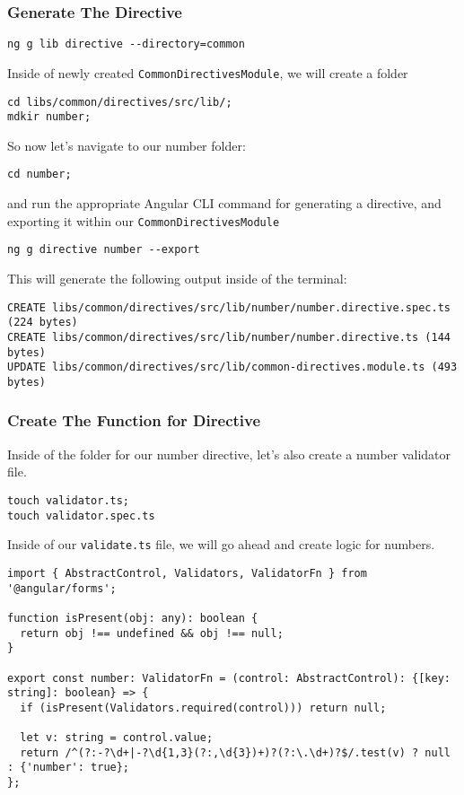 \subsubsection{Generate The Directive}
\begin{verbatim}
ng g lib directive --directory=common  
\end{verbatim}

Inside of newly created \lstinline{CommonDirectivesModule}, we will create 
a folder 
\begin{verbatim}
cd libs/common/directives/src/lib/;
mdkir number; 
\end{verbatim}

So now let's navigate to our number folder:
\begin{verbatim} 
cd number;  
\end{verbatim}  

and run the appropriate Angular CLI command for generating a directive, 
and exporting it within our \lstinline{CommonDirectivesModule}

\begin{verbatim}
ng g directive number --export  
\end{verbatim}

This will generate the following output inside of the terminal: 
\begin{verbatim}
CREATE libs/common/directives/src/lib/number/number.directive.spec.ts (224 bytes)
CREATE libs/common/directives/src/lib/number/number.directive.ts (144 bytes)
UPDATE libs/common/directives/src/lib/common-directives.module.ts (493 bytes)
\end{verbatim}

\subsubsection{Create The Function for Directive}
Inside of the folder for our number directive, let's also create a number validator file.

\begin{verbatim}
touch validator.ts;
touch validator.spec.ts
\end{verbatim}

Inside of our \lstinline{validate.ts} file, we will go ahead and create logic for numbers.

\begin{lstlisting}[caption=number-validator.ts]
import { AbstractControl, Validators, ValidatorFn } from '@angular/forms';

function isPresent(obj: any): boolean {
  return obj !== undefined && obj !== null;
}

export const number: ValidatorFn = (control: AbstractControl): {[key: string]: boolean} => {
  if (isPresent(Validators.required(control))) return null;

  let v: string = control.value;
  return /^(?:-?\d+|-?\d{1,3}(?:,\d{3})+)?(?:\.\d+)?$/.test(v) ? null : {'number': true};
}; 
\end{lstlisting}

